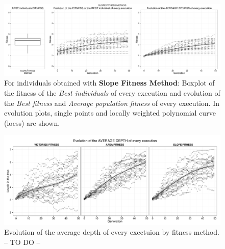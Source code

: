\documentclass[preprint]{elsarticle}
\begin{document}
    \begin{figure}[ht]
 \begin{center}
   \includegraphics[width=12cm]{nuevas_imgs/estudio_slope.pdf}
 \end{center}
 \caption{For individuals obtained with \textbf{Slope Fitness Method}: Boxplot of the fitness of the \emph{Best individuals} of every execution and evolution of the \emph{Best fitness} and \emph{Average population fitness} of every execution. In evolution plots, single points and locally weighted polynomial curve (loess) are shown.}
 \label{figura:e_fitness_slope}
 \end{figure}




 \begin{figure}[ht]
 \begin{center}
   \includegraphics[width=12cm]{nuevas_imgs/evolution_AVERAGE_DEPTH.pdf}
 \end{center}
 \caption{Evolution of the average depth of every exectuion by fitness
   method. -- TO DO --} %
 \label{figura:evolutionDEPTH}
 \end{figure}
\end{document}
